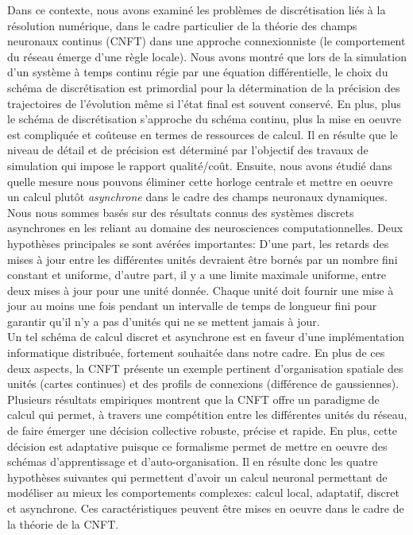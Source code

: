 Dans ce contexte, nous avons examiné les problèmes de discrétisation liés à la résolution numérique, dans le cadre particulier de la théorie des champs neuronaux continus (CNFT) \cite{Wilson:1973, Amari:1977} dans une approche connexionniste (le comportement du réseau émerge d'une règle locale). Nous avons montré que lors de la simulation d'un système à temps continu régie par une équation différentielle, le choix du schéma de discrétisation est primordial pour la détermination de la précision des trajectoires de l'évolution même si l'état final est souvent conservé. En plus, plus le schéma de discrétisation s'approche du schéma continu, plus la mise en oeuvre est compliquée et coûteuse en termes de ressources de calcul. Il en résulte que le niveau de détail et de précision est déterminé par l'objectif des travaux de simulation qui impose le rapport qualité/coût. Ensuite, nous avons étudié dans quelle mesure nous pouvons éliminer cette horloge centrale et mettre en oeuvre un calcul plutôt \textit{asynchrone} dans le cadre des champs neuronaux dynamiques. Nous nous sommes basés sur des résultats connus des systèmes discrets asynchrones en les reliant au domaine des neurosciences computationnelles. Deux hypothèses principales se sont avérées importantes: D'une part, les retards des mises à jour entre les différentes unités devraient être bornés par un nombre fini constant et uniforme, d'autre part, il y a une limite maximale uniforme, entre deux mises à jour pour une unité donnée. Chaque unité doit fournir une mise à jour au moins une fois pendant un intervalle de temps de longueur fini pour garantir qu'il n'y a pas d'unités qui ne se mettent jamais à jour. \\%

Un tel schéma de calcul discret et asynchrone est en faveur d'une implémentation informatique distribuée, fortement souhaitée dans notre cadre. En plus de ces deux aspects, la CNFT présente un exemple pertinent d'organisation spatiale des unités (cartes continues) et des profils de connexions (différence de gaussiennes). Plusieurs résultats empiriques montrent que la CNFT offre un paradigme de calcul qui permet, à travers une compétition entre les différentes unités du réseau, de faire émerger une décision collective robuste, précise et rapide. En plus, cette décision est adaptative puisque ce formalisme permet de mettre en oeuvre des schémas d'apprentissage et d'auto-organisation. Il en résulte donc les quatre hypothèses suivantes qui permettent d'avoir un calcul neuronal permettant de modéliser au mieux les comportements complexes: calcul local, adaptatif, discret et asynchrone. Ces caractéristiques peuvent être mises en oeuvre dans le cadre de la théorie de la CNFT. \\%

